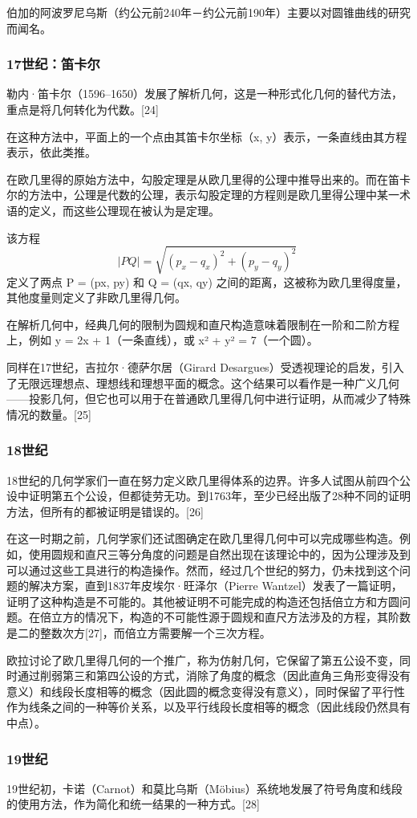 伯加的阿波罗尼乌斯（约公元前240年－约公元前190年）主要以对圆锥曲线的研究而闻名。
\subsubsection{17世纪：笛卡尔} 
勒内·笛卡尔（1596–1650）发展了解析几何，这是一种形式化几何的替代方法，重点是将几何转化为代数。[24]

在这种方法中，平面上的一个点由其笛卡尔坐标（x, y）表示，一条直线由其方程表示，依此类推。

在欧几里得的原始方法中，勾股定理是从欧几里得的公理中推导出来的。而在笛卡尔的方法中，公理是代数的公理，表示勾股定理的方程则是欧几里得公理中某一术语的定义，而这些公理现在被认为是定理。

该方程
\[
|PQ| = \sqrt{(p_x - q_x)^2 + (p_y - q_y)^2}~
\]
定义了两点 P = (px, py) 和 Q = (qx, qy) 之间的距离，这被称为欧几里得度量，其他度量则定义了非欧几里得几何。

在解析几何中，经典几何的限制为圆规和直尺构造意味着限制在一阶和二阶方程上，例如 y = 2x + 1（一条直线），或 x² + y² = 7（一个圆）。

同样在17世纪，吉拉尔·德萨尔居（Girard Desargues）受透视理论的启发，引入了无限远理想点、理想线和理想平面的概念。这个结果可以看作是一种广义几何——投影几何，但它也可以用于在普通欧几里得几何中进行证明，从而减少了特殊情况的数量。[25]
\subsubsection{18世纪}  
18世纪的几何学家们一直在努力定义欧几里得体系的边界。许多人试图从前四个公设中证明第五个公设，但都徒劳无功。到1763年，至少已经出版了28种不同的证明方法，但所有的都被证明是错误的。[26]

在这一时期之前，几何学家们还试图确定在欧几里得几何中可以完成哪些构造。例如，使用圆规和直尺三等分角度的问题是自然出现在该理论中的，因为公理涉及到可以通过这些工具进行的构造操作。然而，经过几个世纪的努力，仍未找到这个问题的解决方案，直到1837年皮埃尔·旺泽尔（Pierre Wantzel）发表了一篇证明，证明了这种构造是不可能的。其他被证明不可能完成的构造还包括倍立方和方圆问题。在倍立方的情况下，构造的不可能性源于圆规和直尺方法涉及的方程，其阶数是二的整数次方[27]，而倍立方需要解一个三次方程。

欧拉讨论了欧几里得几何的一个推广，称为仿射几何，它保留了第五公设不变，同时通过削弱第三和第四公设的方式，消除了角度的概念（因此直角三角形变得没有意义）和线段长度相等的概念（因此圆的概念变得没有意义），同时保留了平行性作为线条之间的一种等价关系，以及平行线段长度相等的概念（因此线段仍然具有中点）。
\subsubsection{19世纪}
19世纪初，卡诺（Carnot）和莫比乌斯（Möbius）系统地发展了符号角度和线段的使用方法，作为简化和统一结果的一种方式。[28]